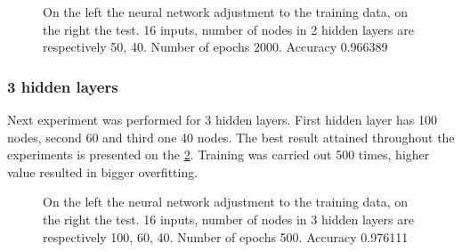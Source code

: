 \begin{figure}[H]
	\begin{center}
	\end{center}
	\caption{On the left the neural network adjustment to the training data, on the right the test. 16 inputs, number of nodes in 2 hidden layers are respectively 50, 40. Number of epochs 2000. Accuracy \num{0.966389}}

	\label{fig:nn_lbp_2_hidden_16_50_40_1_2000_epochs}
\end{figure}

\subsubsection{3 hidden layers}
Next experiment was performed for 3 hidden layers. First hidden layer has 100 nodes, second 60 and third one 40 nodes. The best result attained throughout the experiments is presented on the \figurename{} \ref{fig:nn_lbp_3_hidden_16_100_60_40_1_500_epochs}. Training was carried out 500 times, higher value resulted in bigger overfitting.

\begin{figure}[H]
	\begin{center}
	\end{center}
	\caption{On the left the neural network adjustment to the training data, on the right the test. 16 inputs, number of nodes in 3 hidden layers are respectively 100, 60, 40. Number of epochs 500. Accuracy \num{0.976111}}

	\label{fig:nn_lbp_3_hidden_16_100_60_40_1_500_epochs}
\end{figure}

